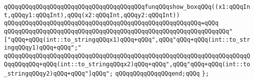 \newline
\newline
\verb|qQQqqQQqqQQqqQQqqQQqqQQqqQQqqQQqqQQqqQQqfunqQQqshow_boxqQQq((x1:qQQqInt,qQQqy1:qQQqInt),qQQq(x2:qQQqInt,qQQqy2:qQQqInt))|\newline
\verb|qQQqqQQqqQQqqQQqqQQqqQQqqQQqqQQqqQQqqQQqqQQqqQQqqQQqqQQq=qQQq|\newline
\verb|qQQqqQQqqQQqqQQqqQQqqQQqqQQqqQQqqQQqqQQqqQQqqQQqqQQqqQQqqQQqqQQq"["qQQq+qQQq(int::to_stringqQQqx1)qQQq+qQQq",qQQq"qQQq+qQQq(int::to_stringqQQqy1)qQQq+qQQq";"|\newline
\verb|qQQqqQQqqQQqqQQqqQQqqQQqqQQqqQQqqQQqqQQqqQQqqQQqqQQqqQQqqQQqqQQqqQQqqQQqqQQqqQQq+qQQq(int::to_stringqQQqx2)qQQq+qQQq",qQQq"qQQq+qQQq(int::to_stringqQQqy2)qQQq+qQQq"]qQQq";|\newline
\newline
\newline
\verb|qQQqqQQqqQQqqQQqend;qQQq|\newline
\newline
\verb|};|\newline
\newline

